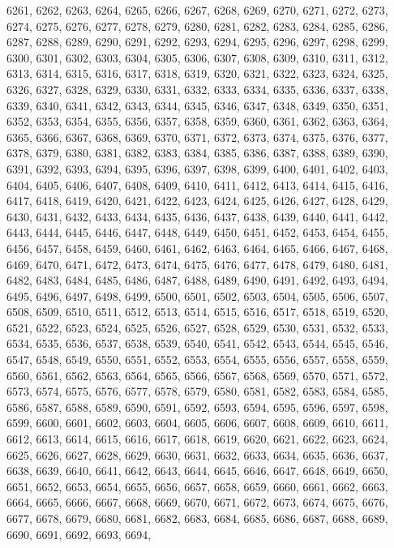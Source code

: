 6261,
6262,
6263,
6264,
6265,
6266,
6267,
6268,
6269,
6270,
6271,
6272,
6273,
6274,
6275,
6276,
6277,
6278,
6279,
6280,
6281,
6282,
6283,
6284,
6285,
6286,
6287,
6288,
6289,
6290,
6291,
6292,
6293,
6294,
6295,
6296,
6297,
6298,
6299,
6300,
6301,
6302,
6303,
6304,
6305,
6306,
6307,
6308,
6309,
6310,
6311,
6312,
6313,
6314,
6315,
6316,
6317,
6318,
6319,
6320,
6321,
6322,
6323,
6324,
6325,
6326,
6327,
6328,
6329,
6330,
6331,
6332,
6333,
6334,
6335,
6336,
6337,
6338,
6339,
6340,
6341,
6342,
6343,
6344,
6345,
6346,
6347,
6348,
6349,
6350,
6351,
6352,
6353,
6354,
6355,
6356,
6357,
6358,
6359,
6360,
6361,
6362,
6363,
6364,
6365,
6366,
6367,
6368,
6369,
6370,
6371,
6372,
6373,
6374,
6375,
6376,
6377,
6378,
6379,
6380,
6381,
6382,
6383,
6384,
6385,
6386,
6387,
6388,
6389,
6390,
6391,
6392,
6393,
6394,
6395,
6396,
6397,
6398,
6399,
6400,
6401,
6402,
6403,
6404,
6405,
6406,
6407,
6408,
6409,
6410,
6411,
6412,
6413,
6414,
6415,
6416,
6417,
6418,
6419,
6420,
6421,
6422,
6423,
6424,
6425,
6426,
6427,
6428,
6429,
6430,
6431,
6432,
6433,
6434,
6435,
6436,
6437,
6438,
6439,
6440,
6441,
6442,
6443,
6444,
6445,
6446,
6447,
6448,
6449,
6450,
6451,
6452,
6453,
6454,
6455,
6456,
6457,
6458,
6459,
6460,
6461,
6462,
6463,
6464,
6465,
6466,
6467,
6468,
6469,
6470,
6471,
6472,
6473,
6474,
6475,
6476,
6477,
6478,
6479,
6480,
6481,
6482,
6483,
6484,
6485,
6486,
6487,
6488,
6489,
6490,
6491,
6492,
6493,
6494,
6495,
6496,
6497,
6498,
6499,
6500,
6501,
6502,
6503,
6504,
6505,
6506,
6507,
6508,
6509,
6510,
6511,
6512,
6513,
6514,
6515,
6516,
6517,
6518,
6519,
6520,
6521,
6522,
6523,
6524,
6525,
6526,
6527,
6528,
6529,
6530,
6531,
6532,
6533,
6534,
6535,
6536,
6537,
6538,
6539,
6540,
6541,
6542,
6543,
6544,
6545,
6546,
6547,
6548,
6549,
6550,
6551,
6552,
6553,
6554,
6555,
6556,
6557,
6558,
6559,
6560,
6561,
6562,
6563,
6564,
6565,
6566,
6567,
6568,
6569,
6570,
6571,
6572,
6573,
6574,
6575,
6576,
6577,
6578,
6579,
6580,
6581,
6582,
6583,
6584,
6585,
6586,
6587,
6588,
6589,
6590,
6591,
6592,
6593,
6594,
6595,
6596,
6597,
6598,
6599,
6600,
6601,
6602,
6603,
6604,
6605,
6606,
6607,
6608,
6609,
6610,
6611,
6612,
6613,
6614,
6615,
6616,
6617,
6618,
6619,
6620,
6621,
6622,
6623,
6624,
6625,
6626,
6627,
6628,
6629,
6630,
6631,
6632,
6633,
6634,
6635,
6636,
6637,
6638,
6639,
6640,
6641,
6642,
6643,
6644,
6645,
6646,
6647,
6648,
6649,
6650,
6651,
6652,
6653,
6654,
6655,
6656,
6657,
6658,
6659,
6660,
6661,
6662,
6663,
6664,
6665,
6666,
6667,
6668,
6669,
6670,
6671,
6672,
6673,
6674,
6675,
6676,
6677,
6678,
6679,
6680,
6681,
6682,
6683,
6684,
6685,
6686,
6687,
6688,
6689,
6690,
6691,
6692,
6693,
6694,
